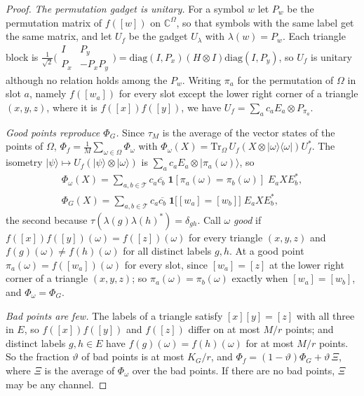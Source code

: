 \begin{proof}
\emph{The permutation gadget is unitary.} For a symbol $w$ let $P_w$ be the permutation matrix of $f([w])$ on $\mathbb C^\Omega$, so that symbols
with the same label get the same matrix, and let $U_f$ be the gadget $U_\lambda$ with $\lambda(w)=P_w$. Each triangle block is
$\frac1{\sqrt2}\bigl(\begin{smallmatrix}I&P_y\\P_x&-P_xP_y\end{smallmatrix}\bigr)=\mathrm{diag}(I,P_x)(H\otimes I)\mathrm{diag}(I,P_y)$, so $U_f$ is unitary
although no relation holds among the $P_w$. Writing $\pi_a$ for the permutation of $\Omega$ in slot $a$, namely $f([w_a])$ for every slot except the
lower right corner of a triangle $(x,y,z)$, where it is $f([x])f([y])$, we have $U_f=\sum_ac_aE_a\otimes P_{\pi_a}$.

\emph{Good points reproduce $\Phi_G$.} Since $\tau_M$ is the average of the vector states of the points of $\Omega$, $\Phi_f=\frac1M\sum_{\omega\in\Omega}\Phi_\omega$ with
$\Phi_\omega(X)=\mathrm{Tr}_\Omega\,U_f(X\otimes|\omega\rangle\langle\omega|)U_f^*$. The isometry $|\psi\rangle\mapsto U_f(|\psi\rangle\otimes|\omega\rangle)$ is
$\sum_ac_aE_a\otimes|\pi_a(\omega)\rangle$, so
\begin{gather*}
\Phi_\omega(X)=\sum_{a,b\in\mathcal T}c_a\overline{c_b}\;\mathbf 1[\pi_a(\omega)=\pi_b(\omega)]\;E_aXE_b^*,\\
\Phi_G(X)=\sum_{a,b\in\mathcal T}c_a\overline{c_b}\;\mathbf 1\bigl[[w_a]=[w_b]\bigr]\;E_aXE_b^*,
\end{gather*}
the second because $\tau(\lambda(g)\lambda(h)^*)=\delta_{gh}$. Call $\omega$ \emph{good} if $f([x])f([y])(\omega)=f([z])(\omega)$ for every triangle
$(x,y,z)$ and $f(g)(\omega)\ne f(h)(\omega)$ for all distinct labels $g,h$. At a good point $\pi_a(\omega)=f([w_a])(\omega)$ for every slot, since
$[w_a]=[z]$ at the lower right corner of a triangle $(x,y,z)$; so $\pi_a(\omega)=\pi_b(\omega)$ exactly when $[w_a]=[w_b]$, and $\Phi_\omega=\Phi_G$.

\emph{Bad points are few.} The labels of a triangle satisfy $[x][y]=[z]$ with all three in $E$, so $f([x])f([y])$ and $f([z])$ differ on at most
$M/r$ points; and distinct labels $g,h\in E$ have $f(g)(\omega)=f(h)(\omega)$ for at most $M/r$ points. So the fraction $\vartheta$ of bad points is
at most $K_G/r$, and $\Phi_f=(1-\vartheta)\Phi_G+\vartheta\,\Xi$, where $\Xi$ is the average of $\Phi_\omega$ over the bad points. If there are no
bad points, $\Xi$ may be any channel.


\end{proof}
